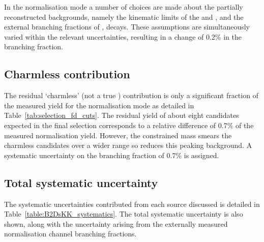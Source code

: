 In the normalisation mode a number of choices are made about the partially reconstructed backgrounds, namely the kinematic limits of the \decay{\Bp}{\Dssp\Dzb} and \decay{\Bp}{\Dsp\Dstarzb}, and the external branching fractions of \decay{\Dssp}{\Dsp[\Pgamma/\piz]},
 \decay{\Dstarzb}{\Dzb[\Pgamma/\piz]} decays. These assumptions are simultaneously varied within the relevant uncertainties, resulting in a change of 0.2\% in the branching fraction.



\subsection{Charmless contribution}

The residual `charmless' (not a true \Dsp) contribution is only a significant fraction of the measured yield for the normalisation mode as detailed in Table~\ref{tab:selection_fd_cuts}. The residual yield of about eight candidates expected in the final selection corresponds to a relative difference of 0.7\% of the measured normalisation yield. However, the constrained \Dsp mass smears the charmless candidates over a wider range so reduces this peaking background.
A systematic uncertainty on the branching fraction of 0.7\% is assigned.



\subsection{Total systematic uncertainty}
The systematic uncertainties contributed from each source discussed is detailed in Table~\ref{table:B2DsKK_systematics}. The total systematic uncertainty is also shown, along with the uncertainty arising from the externally measured normalisation channel branching fractions. 

